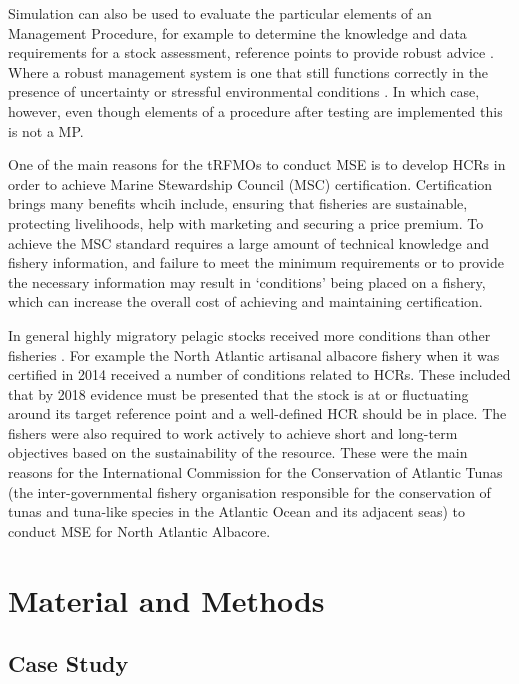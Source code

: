 \documentclass[%
nonumbib,      %
%
]{nrc1}                          %
\begin{document}
Simulation can also be used to evaluate the particular elements of an Management Procedure, for example to determine the knowledge and data requirements for a stock assessment, reference points  to provide robust advice  \citep[e.g.][]{kell2005flat,kell2005round}. Where a robust management system is one that still functions correctly in the presence of uncertainty or stressful environmental conditions \citep{radatz1990ieee}. In which case, however, even though elements of a procedure after testing are implemented this is not a MP.

One of the main reasons for the tRFMOs to conduct MSE is to develop HCRs in order to achieve Marine Stewardship Council (MSC) certification. Certification brings many benefits whcih include, ensuring that fisheries are sustainable, protecting livelihoods, help with marketing and securing a price premium. To achieve the MSC standard requires a large amount of technical knowledge and fishery information, and failure to meet the minimum requirements or to provide the necessary information may result in ‘conditions’ being placed on a fishery, which can increase the overall cost of achieving and maintaining certification. 

In general highly migratory pelagic stocks received more conditions than other fisheries \citep{bellchambers2016identifying}. For example the North Atlantic artisanal albacore fishery when it was certified in 2014 received a number of conditions related to HCRs. These included that by 2018 evidence must be presented that the stock is at or fluctuating around its target reference point and a well-defined HCR should be in place. The fishers were also required to work actively to achieve short and long-term objectives based on the sustainability of the resource. These were the main reasons for the International Commission for the Conservation of Atlantic Tunas (the inter-governmental fishery organisation responsible for the conservation of tunas and tuna-like species in the Atlantic Ocean and its adjacent seas) to conduct MSE for North Atlantic Albacore.


\newpage
\section{Material and Methods}

\subsection*{Case Study}
\end{document}
